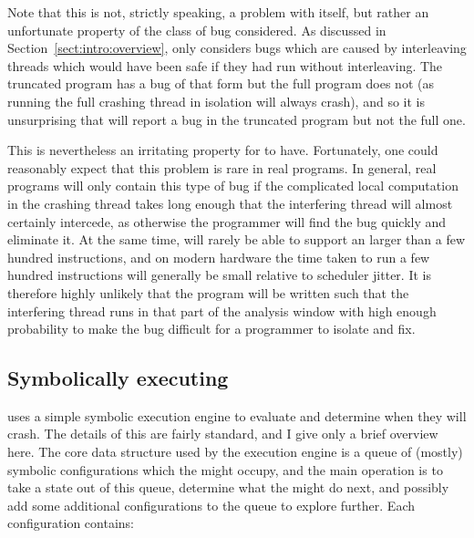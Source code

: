 Note that this is not, strictly speaking, a problem with {\technique}
itself, but rather an unfortunate property of the class of bug
considered.  As discussed in Section~\ref{sect:intro:overview},
{\technique} only considers bugs which are caused by interleaving
threads which would have been safe if they had run without
interleaving.  The truncated program has a bug of that form but the
full program does not (as running the full crashing thread in
isolation will always crash), and so it is unsurprising that
{\technique} will report a bug in the truncated program but not the
full one.

This is nevertheless an irritating property for {\technique} to have.
Fortunately, one could reasonably expect that this problem is rare in
real programs.  In general, real programs will only contain this type
of bug if the complicated local computation in the crashing thread
takes long enough that the interfering thread will almost certainly
intercede, as otherwise the programmer will find the bug quickly and
eliminate it.  At the same time, {\technique} will rarely be able to
support an  larger than a few hundred
instructions, and on modern hardware the time taken to run a few
hundred instructions will generally be small relative to scheduler
jitter.  It is therefore highly unlikely that the program will be
written such that the interfering thread runs in that part of the
analysis window with high enough probability to make the bug difficult
for a programmer to isolate and fix.  


\subsection{Symbolically executing {\StateMachines}}


{\Implementation} uses a simple symbolic execution engine to evaluate
{\StateMachines} and determine when they will crash.  The details of
this are fairly standard, and I give only a brief overview
here.  The core data structure
used by the execution engine is a queue of (mostly) symbolic
configurations which the {\StateMachine} might occupy, and the main
operation is to take a state out of this queue, determine what the
{\StateMachine} might do next, and possibly add some additional
configurations to the queue to explore further.  Each configuration
contains:

